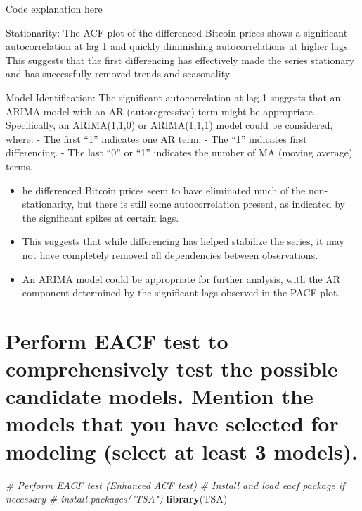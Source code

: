 \documentclass[
]{book}
\newenvironment{Shaded}{\begin{snugshade}}{\end{snugshade}}
\newcommand{\CommentTok}[1]{\textcolor[rgb]{0.56,0.35,0.01}{\textit{#1}}}
\newcommand{\FunctionTok}[1]{\textcolor[rgb]{0.13,0.29,0.53}{\textbf{#1}}}
\newcommand{\NormalTok}[1]{#1}
\providecommand{\tightlist}{%
  \setlength{\itemsep}{0pt}\setlength{\parskip}{0pt}}
\begin{document}
Code explanation here

Stationarity:
The ACF plot of the differenced Bitcoin prices shows a significant autocorrelation at lag 1 and quickly diminishing autocorrelations at higher lags. This suggests that the first differencing has effectively made the series stationary and has successfully removed trends and seasonality

Model Identification:
The significant autocorrelation at lag 1 suggests that an ARIMA model with an AR (autoregressive) term might be appropriate. Specifically, an ARIMA(1,1,0) or ARIMA(1,1,1) model could be considered,
where:
- The first ``1'' indicates one AR term.
- The ``1'' indicates first differencing.
- The last ``0'' or ``1'' indicates the number of MA (moving average) terms.

\begin{itemize}
\tightlist
\item
  he differenced Bitcoin prices seem to have eliminated much of the non-stationarity, but there is still some autocorrelation present, as indicated by the significant spikes at certain lags.
\item
  This suggests that while differencing has helped stabilize the series, it may not have completely removed all dependencies between observations.
\item
  An ARIMA model could be appropriate for further analysis, with the AR component determined by the significant lags observed in the PACF plot.
\end{itemize}

\section{Perform EACF test to comprehensively test the possible candidate models. Mention the models that you have selected for modeling (select at least 3 models).}\label{perform-eacf-test-to-comprehensively-test-the-possible-candidate-models.-mention-the-models-that-you-have-selected-for-modeling-select-at-least-3-models.}

\begin{Shaded}
\begin{Highlighting}[]
\CommentTok{\# Perform EACF test (Enhanced ACF test)}
\CommentTok{\# Install and load eacf package if necessary}
\CommentTok{\# install.packages("TSA")}
\FunctionTok{library}\NormalTok{(TSA)}
\end{Highlighting}
\end{Shaded}
\end{document}
